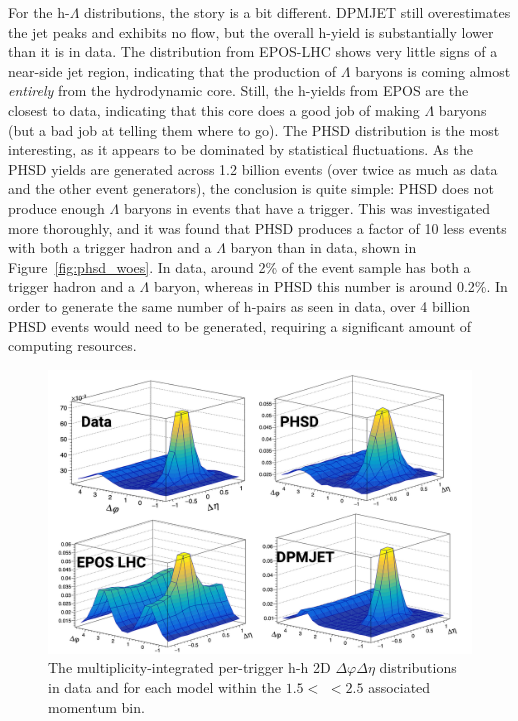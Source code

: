 For the h-$\Lambda$ distributions, the story is a bit different. DPMJET still overestimates the jet peaks and exhibits no flow, but the overall h-\lmb yield is substantially lower than it is in data. The distribution from EPOS-LHC shows very little signs of a near-side jet region, indicating that the production of $\Lambda$ baryons is coming almost \textit{entirely} from the hydrodynamic core. Still, the h-\lmb yields from EPOS are the closest to data, indicating that this core does a good job of making $\Lambda$ baryons (but a bad job at telling them where to go). The PHSD distribution is the most interesting, as it appears to be dominated by statistical fluctuations. As the PHSD yields are generated across 1.2 billion events (over twice as much as data and the other event generators), the conclusion is quite simple: PHSD does not produce enough $\Lambda$ baryons in events that have a trigger. This was investigated more thoroughly, and it was found that PHSD produces a factor of 10 less events with both a trigger hadron and a $\Lambda$ baryon than in data, shown in Figure~\ref{fig:phsd_woes}. In data, around 2\% of the event sample has both a trigger hadron and a $\Lambda$ baryon, whereas in PHSD this number is around 0.2\%. In order to generate the same number of h-\lmb pairs as seen in data, over 4 billion PHSD events would need to be generated, requiring a significant amount of computing resources.


\clearpage
\begin{figure}[ht]
\centering
\includegraphics[width=\textwidth]{figures/results/h_h_2d_modelcomp.png}
\caption{The multiplicity-integrated per-trigger h-h 2D $\Delta\varphi\Delta\eta$ distributions in data and for each model within the $1.5 <$ \pt $< 2.5$ \GeVc associated momentum bin.}
\label{fig:h_h_2d_model}
\end{figure}

